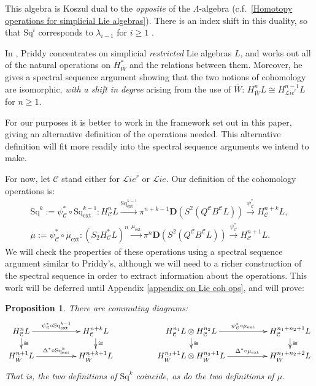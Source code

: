 \documentclass[11pt]{amsart} \renewcommand{\baselinestretch}{1.4}
\theoremstyle{plain}
\newtheorem{prop}[thm]{Proposition}
\theoremstyle{definition}
\renewcommand{\to}{\longrightarrow}
\newcommand{\scrL}{\mathscr{L}}
\newcommand{\calc}{\mathcal{C}}
\newcommand{\citeBOX}[2][]{\cite[\mbox{#1}]{#2}}
\newcommand{\ExtCohOp}{\mathrm{Sq}_\mathrm{ext}}
\newcommand{\ExtCohProd}{\mu_\mathrm{ext}}
\newcommand{\Sq}{\mathrm{Sq}}
\newcommand{\liealgs}{{\scrL\!\textit{ie}}}
\newcommand{\restliealgs}{{\scrL\!\textit{ie}^\textit{r}}}
\newcommand{\dual}{\mathbf{D}}
\begin{document}
\begin{Constructing cohomology operations}
This algebra is Koszul dual to the \emph{opposite} of the $\Lambda$-algebra (c.f.\ \ref{Homotopy operations for simplicial Lie algebras}). There is an index shift in this duality, so that $\Sq^i$ corresponds to $\lambda_{i-1}$ for $i\geq1$ \citeBOX[\S7.1]{PriddyKoszul.pdf}.

In \cite{PriddySimplicialLie.pdf}, Priddy concentrates on simplicial \emph{restricted} Lie algebras $L$, and works out all of the natural operations on $H^*_{\bar{W}}$ and the relations between them. Moreover, he gives a spectral sequence argument showing that the two notions of cohomology are isomorphic, \emph{with a shift in degree} arising from the use of $\bar{W}$: $H_{\bar{W}}^nL\cong H^{n-1}_{\restliealgs}L$ for $n\geq1$.

For our purposes it is better to work in the framework set out in this paper, giving an alternative definition of the operations needed. This alternative definition will fit more readily into the spectral sequence arguments we intend to make. 

For now, let $\calc$ stand either for $\restliealgs$ or $\liealgs$. Our definition of the cohomology operations is:
\begin{gather*}
\Sq^k:=\psi^*_{\calc}\circ\ExtCohOp^{k-1}:H_\calc^{n}L\overset{\ExtCohOp^{k-1}}{\to} \pi^{n+k-1}\dual(S^2(Q^\calc B^\calc L))\overset{\psi_\calc^*}{\to} H_\calc^{n+k}L,\\
\mu:=\psi^*_{\calc}\circ\ExtCohProd:(S_2 H_\calc^{*}L)^{n}\overset{\ExtCohProd}{\to} \pi^{n}\dual(S^2(Q^\calc B^\calc L))\overset{\psi_\calc^*}{\to} H_\calc^{n+1}L.
\end{gather*}
We will check the properties of these operations using a spectral sequence argument similar to Priddy's, although we will need to a richer construction of the spectral sequence in order to extract information about the operations. This work will be deferred until Appendix \ref{appendix on Lie coh ops}, and will prove:
\begin{prop}
\label{all the lie steenrod ops are the same}
There are commuting diagrams:
\[\xymatrix@R=4mm@C=17mm{
H^n_\calc L
\ar[d]^-{\cong}
\ar[r]^-{\psi^*_{\calc}\circ\ExtCohOp^{k-1}}&%
H^{n+k}_\calc L
\ar[d]^-{\cong}
&
H^{n_1}_\calc L\otimes H^{n_2}_\calc L
\ar[d]^-{\cong}
\ar[r]^-{\psi^*_{\calc}\circ\ExtCohProd}&%
H^{n_1+n_2+1}_\calc L
\ar[d]^-{\cong}
\\%
H^{n+1}_{\bar{W}} L
\ar[r]^-{\Delta^*\circ\ExtCohOp^k}&%
H^{n+k+1}_{\bar{W}} L%
&
H^{n_1+1}_{\bar{W}} L\otimes H^{n_2+1}_{\bar{W}} L
\ar[r]^-{\Delta^*\circ\ExtCohProd}&%
H^{n_1+n_2+2}_{\bar{W}} L%
}\]
That is, the two definitions of $\Sq^k$ coincide, as do the two definitions of $\mu$.
\end{prop}


\end{Constructing cohomology operations}
\end{document}
